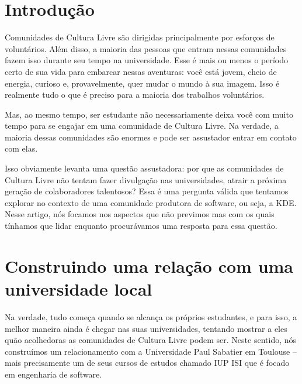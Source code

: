 

\section*{Introdução}
Comunidades de Cultura Livre são dirigidas principalmente por esforços de voluntários. Além disso,
a maioria das pessoas que entram nessas comunidades fazem isso durante seu tempo na universidade.
Esse é mais ou menos o período certo de sua vida para embarcar nessas aventuras:
você está jovem, cheio de energia, curioso e, provavelmente, quer mudar o mundo
à sua imagem. Isso é realmente tudo o que é preciso para a maioria dos trabalhos voluntários.

Mas, ao mesmo tempo, ser estudante não necessariamente deixa você com muito tempo 
para se engajar em uma comunidade de Cultura Livre. Na verdade, a maioria dessas comunidades
são enormes e pode ser assustador entrar em contato com elas.

Isso obviamente levanta uma questão assustadora: por que as comunidades de Cultura Livre
não tentam fazer divulgação nas universidades, atrair a próxima geração de colaboradores
talentosos? Essa é uma pergunta válida que tentamos explorar no contexto de uma comunidade
produtora de software, ou seja, a KDE. Nesse artigo, nós focamos nos aspectos que não previmos
mas com os quais tínhamos que lidar enquanto procurávamos uma resposta para essa questão.

\section*{Construindo uma relação com uma universidade local}
Na verdade, tudo começa quando se alcança os próprios estudantes, e para isso,
a melhor maneira ainda é chegar nas suas universidades, tentando mostrar a eles
quão acolhedoras as comunidades de Cultura Livre podem ser. Neste sentido, nós construímos
um relacionamento com a Universidade Paul Sabatier em Toulouse -- mais precisamente um de
seus cursos de estudos chamado IUP ISI que é focado em engenharia de software.

